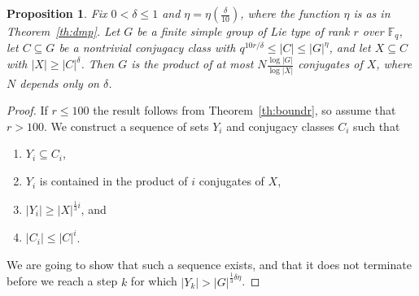 \documentclass[a4paper]{article}
\newtheorem{proposition}{Proposition}[section]
\theoremstyle{definition}
\numberwithin{equation}{section}
\begin{document}
\begin{proposition}\label{pr:xcldelta}
Fix $0<\delta\leq 1$ and $\eta=\eta\left(\frac{\delta}{10}\right)$, where the function $\eta$ is as in Theorem~\ref{th:dmp}. Let $G$ be a finite simple group of Lie type of rank $r$ over $\mathbb{F}_{q}$, let $C\subseteq G$ be a nontrivial conjugacy class with $q^{10r/\delta}\leq|C|\leq|G|^{\eta}$, and let $X\subseteq C$ with $|X|\geq|C|^{\delta}$. Then $G$ is the product of at most $N\frac{\log|G|}{\log|X|}$ conjugates of $X$, where $N$ depends only on $\delta$.
\end{proposition}

\begin{proof}
If $r\leq 100$ the result follows from Theorem~\ref{th:boundr}, so assume that $r>100$. We construct a sequence of sets $Y_{i}$ and conjugacy classes $C_{i}$ such that
\begin{enumerate}[(1)]
\item\label{pr:xcldelta-ycl} $Y_{i}\subseteq C_{i}$,
\item\label{pr:xcldelta-yprod} $Y_{i}$ is contained in the product of $i$ conjugates of $X$,
\item\label{pr:xcldelta-ygrow} $|Y_{i}|\geq|X|^{\frac{1}{3}i}$, and
\item\label{pr:xcldelta-clgrow} $|C_{i}|\leq|C|^{i}$.
\end{enumerate}
We are going to show that such a sequence exists, and that it does not terminate before we reach a step $k$ for which $|Y_{k}|>|G|^{\frac{1}{3}\delta\eta}$.


\end{proof}
\end{document}
